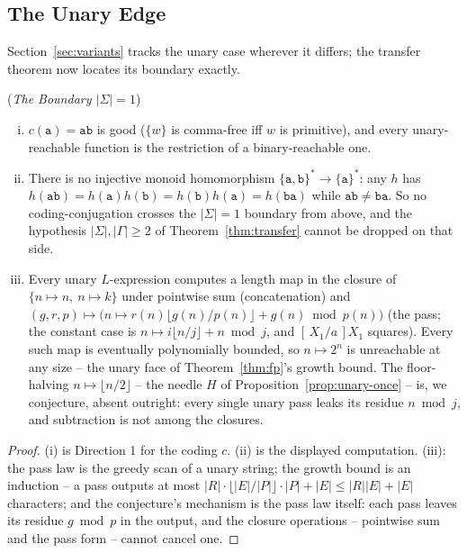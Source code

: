 \documentclass[runningheads,envcountsect]{llncs}
\begin{document}
\subsection{The Unary Edge}

Section~\ref{sec:variants} tracks the unary case wherever it differs; the transfer theorem now locates its boundary exactly.

\begin{proposition}
    (\emph{The Boundary $|\Sigma| = 1$})
    \label{prop:unary-edge}
    \begin{enumerate}[(i)]
        \item $c(\mathtt{a}) = \mathtt{ab}$ is good ($\{w\}$ is comma-free iff $w$ is primitive), and every unary-reachable function is the restriction of a binary-reachable one.
        \item There is no injective monoid homomorphism $\{\mathtt{a}, \mathtt{b}\}^* \rightarrow \{\mathtt{a}\}^*$: any $h$ has $h(\mathtt{ab}) = h(\mathtt{a})h(\mathtt{b}) = h(\mathtt{b})h(\mathtt{a}) = h(\mathtt{ba})$ while $\mathtt{ab} \ne \mathtt{ba}$. So no coding-conjugation crosses the $|\Sigma| = 1$ boundary from above, and the hypothesis $|\Sigma|, |\Gamma| \geq 2$ of Theorem~\ref{thm:transfer} cannot be dropped on that side.
        \item Every unary $L$-expression computes a length map in the closure of $\{n \mapsto n,\ n \mapsto k\}$ under pointwise sum (concatenation) and $(g,r,p) \mapsto \big(n \mapsto r(n) \lfloor g(n)/p(n) \rfloor + g(n) \bmod p(n)\big)$ (the pass; the constant case is $n \mapsto i\lfloor n/j \rfloor + n \bmod j$, and $[\,X_1/a\,]X_1$ squares). Every such map is eventually polynomially bounded, so $n \mapsto 2^n$ is unreachable at any size -- the unary face of Theorem~\ref{thm:fp}'s growth bound. The floor-halving $n \mapsto \lfloor n/2 \rfloor$ -- the needle $H$ of Proposition~\ref{prop:unary-once} -- is, we conjecture, absent outright: every single unary pass leaks its residue $n \bmod j$, and subtraction is not among the closures.
    \end{enumerate}
\end{proposition}

\begin{proof}
    (i) is Direction 1 for the coding $c$. (ii) is the displayed computation. (iii): the pass law is the greedy scan of a unary string; the growth bound is an induction -- a pass outputs at most $|R| \cdot \lfloor |E|/|P| \rfloor \cdot |P| + |E| \le |R||E| + |E|$ characters; and the conjecture's mechanism is the pass law itself: each pass leaves its residue $g \bmod p$ in the output, and the closure operations -- pointwise sum and the pass form -- cannot cancel one.
\end{proof}
\end{document}
